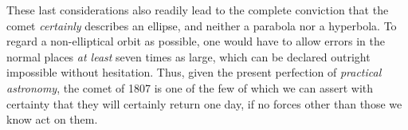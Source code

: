 These last considerations also readily lead to the complete conviction that the comet \emph{certainly} describes an ellipse, and neither a parabola nor a hyperbola. To regard a non-elliptical orbit as possible, one would have to allow errors in the normal places \emph{at least} seven times as large, which can be declared outright impossible without hesitation. Thus, given the present perfection of \emph{practical astronomy}, the comet of 1807 is one of the few of which we can assert with certainty that they will certainly return one day, if no forces other than those we know act on them.
